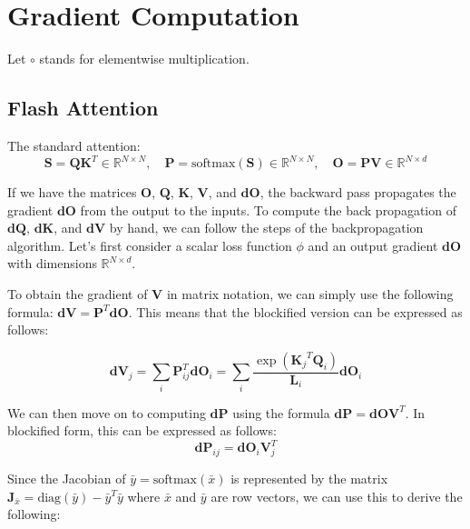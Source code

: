 \section{Gradient Computation}

Let $\circ$ stands for elementwise multiplication.

\subsection{Flash Attention}

The standard attention:
$$\mathbf{S}=\mathbf{Q}\mathbf{K}^T \in \mathbb{R}^{N\times N},\quad \mathbf{P} = \text{softmax}(\mathbf{S}) \in \mathbb{R}^{N \times N},\quad \mathbf{O} = \mathbf{PV}\in \mathbb{R}^{N\times d}$$


If we have the matrices $\mathbf{O}$, $\mathbf{Q}$, $\mathbf{K}$, $\mathbf{V}$, and $\mathbf{dO}$, the backward pass propagates the gradient $\mathbf{dO}$ from the output to the inputs.
To compute the back propagation of $\mathbf{dQ}$, $\mathbf{dK}$, and $\mathbf{dV}$ by hand, we can follow the steps of the backpropagation algorithm.
Let's first consider a scalar loss function $\phi$ and an output gradient $\mathbf{dO}$ with dimensions $\mathbb{R}^{N\times d}$.

To obtain the gradient of $\mathbf{V}$ in matrix notation, we can simply use the following formula: $\mathbf{dV} = \mathbf{P}^T\mathbf{dO}$. This means that the blockified version can be expressed as follows:

\begin{equation}
\mathbf{dV}_j = \sum_i \mathbf{P}_{ij}^T\mathbf{dO}_i = \sum_{i}\frac{\exp({\mathbf{K}_j}^T\mathbf{Q}_i)}{\mathbf{L}_i}\mathbf{dO}_i \label{eq:mha1}
\end{equation}

We can then move on to computing $\mathbf{dP}$ using the formula $\mathbf{dP} = \mathbf{dOV}^T$. In blockified form, this can be expressed as follows: 
$$\mathbf{dP}_{ij}=\mathbf{dO}_i\mathbf{V}_j^T$$

Since the Jacobian of $\bar{y} = \text{softmax}(\bar{x})$ is represented by the matrix $\mathbf{J}_{\bar{x}}=\text{diag}(\bar{y})-\bar{y}^T\bar{y}$ where $\bar{x}$ and $\bar{y}$ are row vectors, we can use this to derive the following:

